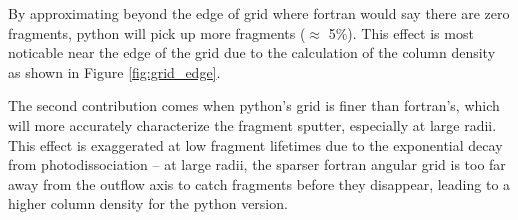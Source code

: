\documentclass[11pt]{article}
\begin{document}
By approximating beyond the edge of grid where fortran would say there are zero fragments, python will pick up more fragments (\(\approx\) 5\%).
This effect is most noticable near the edge of the grid due to the calculation of the column density as shown in Figure \ref{fig:grid_edge}.

The second contribution comes when python's grid is finer than fortran's, which will more accurately characterize the fragment sputter, especially at large radii.
This effect is exaggerated at low fragment lifetimes due to the exponential decay from photodissociation -- at large radii, the sparser fortran angular grid is too far away from the outflow axis to catch fragments before they disappear, leading to a higher column density for the python version.
\end{document}

